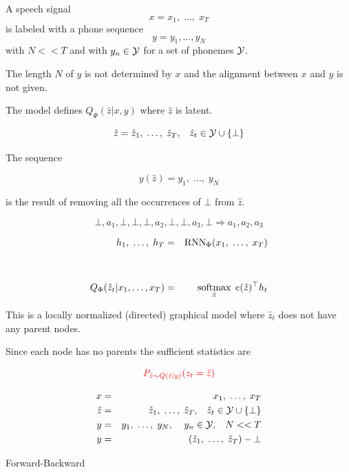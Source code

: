 {A speech signal
$$x = x_1,\; \ldots,\; x_T$$
is labeled with a phone sequence
$$y = y_1, \ldots, y_N$$
with $N << T$ and with $y_n \in {\cal Y}$ for a set of phonemes ${\cal Y}$.

\vfill
The length $N$ of $y$ is not determined by $x$ and the alignment between $x$ and $y$ is not given.

The model defines $Q_\Phi(\hat{z}|x,y)$ where $\hat{z}$ is latent.

\vfill
$$\hat{z} = \hat{z}_1,\;\ldots,\;\hat{z}_T,\;\;\;\hat{z}_t \in {\cal Y} \cup \{\bot\}$$

\vfill
The sequence

\vfill
$$y(\hat{z}) = y_1,\;\ldots,\;y_N$$

\vfill
is the result of removing all the occurrences of $\bot$ from $\hat{z}$.

$$\bot,a_1,\bot,\bot,\bot,a_2,\bot,\bot,a_3,\bot \Rightarrow a_1,a_2,a_3$$


\begin{eqnarray*}
  h_1,\;\ldots,\;h_T & = & \mathrm{RNN}_\Phi(x_1,\;\ldots,\;x_T) \\
  \\
  \\
  Q_\Phi(\hat{z}_t|x_1,\ldots,x_T) & = & \operatorname*{softmax}_{\hat{z}} \;e(\hat{z})^\top h_t
\end{eqnarray*}

\vfill
This is a locally normalized (directed) graphical model where $\hat{z}_t$ does not have any parent nodes.


Since each node has no parents the sufficient statistics are

\vfill
$${\color{red}P_{\hat{z} \sim Q(\hat{z}|y)}(z_t = \tilde{z})}$$


\begin{eqnarray*}
  x & = & x_1,\;\ldots,\; x_T \\
  \hat{z} & = & \hat{z}_1, \;\ldots,\;\hat{z}_T,\;\;\;\hat{z}_t \in {\cal Y}\cup \{\bot\} \\
  y & = & y_1,\;\ldots,\;y_N,\;\;\;\;y_n \in {\cal Y},\;\;\;N << T \\
  y & = & (\hat{z}_1,\;\ldots,\;\hat{z}_T) - \bot
\end{eqnarray*}
\vfill

Forward-Backward

}
